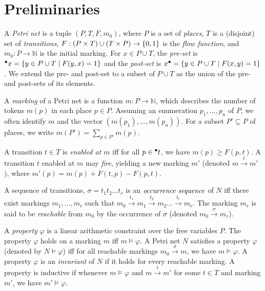 \section{Preliminaries}
\label{sec_preliminaries}

A \emph{Petri net} is a tuple $(P, T, F, m_0)$, where $P$ is a set of
\emph{places}, $T$ is a (disjoint) set of \emph{transitions},
$F : (P\times T) \cup (T\times P) \to {\{ 0,1 \}}$ is the \emph{flow function},
and $m_0: P \rightarrow \mathbb{N}$ is the initial marking.
%
For $x\in P\cup T$, the \emph{pre-set} is
$\prescript{\bullet}{}{x}=\{y\in P\cup T\mid F(y,x) =1\}$
and the \emph{post-set} is $x^{\bullet}=\{y\in P\cup T\mid F(x,y) = 1\}$.
We extend the pre- and post-set to a subset of $P \cup T$ as the union of
the pre- and post-sets of its elements.

A \emph{marking} of a Petri net is a function $m\colon P \to \mathbb{N}$,
which describes the number of tokens $m(p)$ in 
each place $p\in P$. 
Assuming an enumeration $p_1, \ldots, p_n$ of $P$, we
often identify $m$ and the vector $(m(p_1), \ldots, m(p_n))$.
For a subset $P'\subseteq P$ of places, we write $m(P') = \sum_{p\in P'} m(p)$.

A transition $t \in T$ is \emph{enabled at $m$} iff
for all $p \in \prescript{\bullet}{}{t}$, we have $m(p) \ge F(p, t)$.
A transition $t$ enabled at $m$ may \emph{fire},
yielding a new marking $m'$ (denoted $m \xrightarrow{t} m'$),
where $m'(p) = m(p) + F(t,p) - F(p,t)$.

A sequence of transitions, $\sigma = t_1 t_2 \ldots t_r$ is an
$\emph{occurrence sequence}$ of $N$ iff there exist markings
$m_1, \ldots, m_r$ such that $m_0 \xrightarrow{t_1} m_1
\xrightarrow{t_2} m_2 \ldots \xrightarrow{t_r} m_r$. The marking
$m_r$ is said to be \emph{reachable} from $m_0$ by the occurrence
of $\sigma$ (denoted $m_0 \xrightarrow{\sigma} m_r$).

A \emph{property} $\varphi$ is a linear arithmetic constraint over the free variables $P$. 
The property $\varphi$ holds on a marking $m$ iff $m \models \varphi$.
% 
A Petri net $N$ satisfies a property $\varphi$ (denoted by $N \models \varphi$)
iff for all reachable markings $m_0 \xrightarrow{\sigma} m$, we have
$m \models \varphi$.
A property $\varphi$ is an \emph{invariant} of $N$ if it holds for every reachable marking.
A property is inductive if whenever $m\models \varphi$ and $m \xrightarrow{t} m'$ for some $t\in T$
and marking $m'$, we have $m'\models \varphi$.

